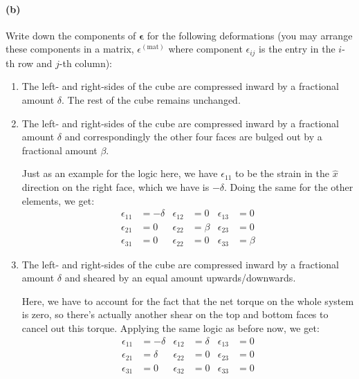 \documentclass{article}
\def\mat{(\textrm{mat})}
\def\strain{\boldsymbol{\epsilon}}
\begin{document}
\paragraph{(b)}
Write down the components of $\strain$ for the following deformations (you may arrange these components in a matrix, $\epsilon^{\mat}$ where component
$\epsilon_{ij}$ is the entry in the $i$-th row and $j$-th column):
	\begin{enumerate}
		\item  {}  The left- and right-sides of the cube are compressed inward by a fractional amount $\delta$.  
		The rest of the cube remains unchanged.
		\item  The left- and right-sides of the cube are compressed inward by a fractional amount $\delta$ and correspondingly the other four faces are bulged out
		by a fractional amount $\beta$.

			\begin{solution}
				Just as an example for the logic here, we have $\epsilon_{11}$ to be the strain in the $\hat{x}$
				direction on the right face, which we have is $-\delta$. Doing the same for the other 
				elements, we get:
				\begin{align*}
					\epsilon_{11} &= -\delta & \epsilon_{12} &= 0 & \epsilon_{13} &= 0 \\
						\epsilon_{21} &= 0 & \epsilon_{22} &= \beta & \epsilon_{23} &= 0\\
						\epsilon_{31} &= 0 & \epsilon_{22} &= 0 & \epsilon_{33}&= \beta
				\end{align*}
			\end{solution}
		\item  The left- and right-sides of the cube are compressed inward by a fractional amount $\delta$ and sheared by an equal amount upwards/downwards.

			\begin{solution}
				Here, we have to account for the fact that the net torque on the whole system is zero, so 
				there's actually another shear on the top and bottom faces to cancel out this torque. Applying 
				the same logic as before now, we get: 
				\begin{align*}
					\epsilon_{11}&= -\delta & \epsilon_{12} &= \delta & \epsilon_{13} &= 0\\
					\epsilon_{21} &= \delta & \epsilon_{22} &= 0 & \epsilon_{23} &= 0\\ 
					\epsilon_{31} &= 0 & \epsilon_{32} &= 0 & \epsilon_{33} &= 0
				\end{align*}
			\end{solution}
	\end{enumerate}
\end{document}
